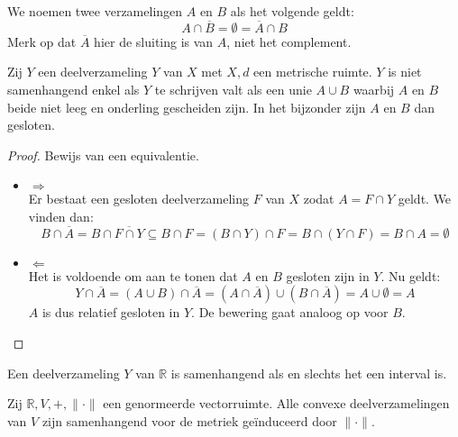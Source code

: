\documentclass[main.tex]{subfiles}
\begin{document}
\begin{de}
  We noemen twee verzamelingen $A$ en $B$  als het volgende geldt:
  \[ A \cap \overline{B} = \emptyset = \overline{A} \cap B \]
  Merk op dat $\overline{A}$ hier de sluiting is van $A$, niet het complement.
\end{de}

\begin{bpr}
  \label{pr:karakterisatie-niet-samenhangend}
  Zij $Y$ een deelverzameling $Y$ van $X$ met $X,d$ een metrische ruimte.
  $Y$ is niet samenhangend enkel als $Y$ te schrijven valt als een unie $A \cup B$ waarbij $A$ en $B$ beide niet leeg en onderling gescheiden zijn.
  In het bijzonder zijn $A$ en $B$ dan gesloten.

  \begin{proof}
    Bewijs van een equivalentie.
    \begin{itemize}
    \item $\Rightarrow$\\
      Er bestaat een gesloten deelverzameling $F$ van $X$ zodat $A = F \cap Y$ geldt.
      We vinden dan:
      \[ B \cap \overline{A} = B \cap \overline{F \cap Y} \subseteq B \cap F = (B \cap Y) \cap F = B \cap (Y \cap F) = B \cap A = \emptyset \]
    \item $\Leftarrow$\\
      Het is voldoende om aan te tonen dat $A$ en $B$ gesloten zijn in $Y$.
      Nu geldt:
      \[ Y \cap \overline{A} = (A \cup B) \cap \overline{A} = (A \cap \overline{A}) \cup (B \cap \overline{A}) = A \cup \emptyset = A \]
      $A$ is dus relatief gesloten in $Y$.
      De bewering gaat analoog op voor $B$.
    \end{itemize}
  \end{proof}
\end{bpr}

\begin{bpr}
  Een deelverzameling $Y$ van $\mathbb{R}$ is samenhangend als en slechts het een interval is.
\end{bpr}

\begin{bpr}
  Zij $\mathbb{R},V,+, \|\cdot\|$ een genormeerde vectorruimte.
  Alle convexe deelverzamelingen van $V$ zijn samenhangend voor de metriek ge\"induceerd door $\|\cdot\|$.
\end{bpr}
\end{document}
